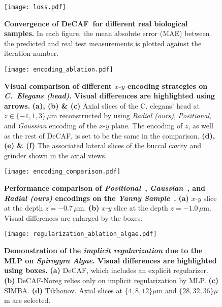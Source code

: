\documentclass[11pt]{article}
\theoremstyle{plain} %
\def\proposed{DeCAF}
\begin{document}
\begin{figure}[t!]
\begin{center}
\texttt{[image: loss.pdf]}
\end{center}
\caption{
\textbf{Convergence of \proposed~for different real biological samples.}
In each figure, the mean absolute error (MAE) between the predicted and real test measurements is plotted against the iteration number.
}
\label{Fig:loss}
\end{figure}

\begin{figure}[t!]
\begin{center}
\texttt{[image: encoding\_ablation.pdf]}
\end{center}
\caption{
\textbf{Visual comparison of different $x$-$y$ encoding strategies on \emph{C.\ Elegans (head)}. Visual differences are highlighted using arrows.}
\textbf{(a), (b) \& (c)} Axial slices of the C. elegans' head at $z\in\{-1,1,3\}\,\mu$m reconstructed by using \emph{Radial (ours)}, \emph{Positional}, and \emph{Gaussian} encoding of the $x$-$y$ plane. 
The encoding of $z$, as well as the rest of \proposed, is set to be the same in the comparison.
\textbf{(d), (e) \& (f)} The associated lateral slices of the buccal cavity and grinder shown in the axial views.}
\label{Fig:encoding_ablation}
\end{figure}
\clearpage

\begin{figure}[t]
\begin{center}
\texttt{[image: encoding\_comparison.pdf]}
\end{center}
\caption{
\textbf{Performance comparison of \emph{Positional}~\cite{Mildenhall.etal2020}, \emph{Gaussian}~\cite{Tancik.etal2020}, and \emph{Radial (ours)} encodings on the \emph{Yanny Sample}~\cite{Yanny.etal2022}.} \textbf{(a)} $x$-$y$ slice at the depth $z=-0.7\,\mu$m. \textbf{(b)} $x$-$y$ slice at the depth $z=-1.0\,\mu$m. Visual differences are enlarged by the boxes.}
\label{Fig:Encoding}
\end{figure}
\clearpage

\begin{figure}[t!]
\begin{center}
\texttt{[image: regularization\_ablation\_algae.pdf]}
\end{center}
\caption{
\textbf{Demonstration of the \emph{implicit regularization} due to the MLP on \emph{Spirogyra Algae}. Visual differences are highlighted using boxes.}
\textbf{(a)} \proposed, which includes an explicit regularizer.
\textbf{(b)} \proposed-Noreg relies only on implicit regularization by MLP.
\textbf{(c)} SIMBA.
\textbf{(d)} Tikhonov.
Axial slices at $\{4,8,12\}\mu$m and $\{28,32,36\}\mu$m are selected. 
}
\label{Fig:regularization_ablation_algae}
\end{figure}
\clearpage
\end{document}
